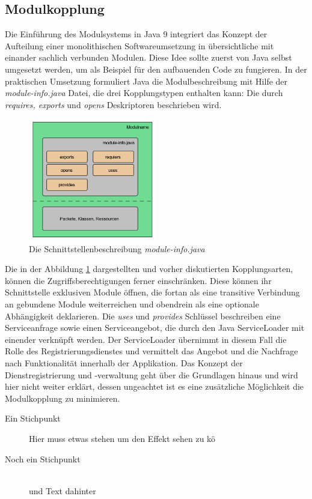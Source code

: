   \subsection{Modulkopplung}
    Die Einführung des Modulsystems in Java 9 integriert das Konzept der Aufteilung einer monolithischen Softwareumsetzung in übersichtliche mit einander sachlich verbunden Modulen. 
    Diese Idee sollte zuerst von Java selbst umgesetzt werden, um als Beispiel für den aufbauenden Code zu fungieren.
    In der praktischen Umsetzung formuliert Java die Modulbeschreibung mit Hilfe der \textit{module-info.java} Datei, die drei Kopplungstypen enthalten kann: Die durch \textit{requires, exports} und \textit{opens} Deskriptoren beschrieben wird.
    \begin{figure}[h!]
      \centering
      \includegraphics[width=0.5\textwidth]{material/images/module-info.png}
      \caption{Die Schnittstellenbeschreibung \textit{module-info.java}}
      \label{fig:module-info}
    \end{figure}
    \newline Die in der Abbildung \ref{fig:module-info} dargestellten und vorher diskutierten Kopplungsarten, können die Zugriffsberechtigungen ferner einschränken.
    Diese können ihr Schnittstelle exklusiven Module öffnen, die fortan als eine transitive Verbindung an gebundene Module weiterreichen und obendrein als eine optionale Abhängigkeit deklarieren.
    Die \textit{uses} und \textit{provides} Schlüssel beschreiben eine Serviceanfrage sowie einen Serviceangebot, die durch den Java ServiceLoader mit einender verknüpft werden.
    Der ServiceLoader übernimmt in diesem Fall die Rolle des Registrierungsdienstes und vermittelt das Angebot und die Nachfrage nach Funktionalität innerhalb der Applikation. 
    Das Konzept der Dienstregistrierung und -verwaltung geht über die Grundlagen hinaus und wird hier nicht weiter erklärt, dessen ungeachtet ist es eine zusätzliche Möglichkeit die Modulkopplung zu minimieren. 
    \begin{description}
      \item[Ein Stichpunkt]\hfill 
      \newline Hier muss etwas stehen um den Effekt sehen zu k{\"o}
      \item[Noch ein Stichpunkt]\hfill \\ und Text dahinter 
    \end{description}

